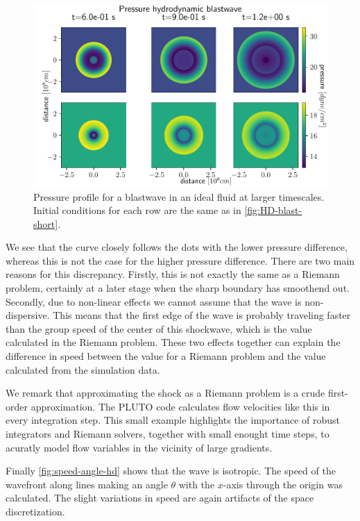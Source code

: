 \begin{figure}[H]
	\centering
	\includegraphics[width=\linewidth]{images/HD-blast-prs-2.pdf}
	\caption{Pressure profile for a blastwave in an ideal fluid at larger timescales. Initial conditions for each row are the same as in \autoref{fig:HD-blast-short}.}
	\label{fig:HD-blast-long}
\end{figure}

We see that the curve closely follows the dots with the lower pressure difference, whereas this is not the case for the higher pressure difference.
There are two main reasons for this discrepancy. 
Firstly, this is not exactly the same as a Riemann problem, certainly at a later stage when the sharp boundary has smoothend out.
Secondly, due to non-linear effects we cannot assume that the wave is non-dispersive. 
This means that the first edge of the wave is probably traveling faster than the group speed of the center of this shockwave, which is the value calculated in the Riemann problem.
These two effects together can explain the difference in speed between the value for a Riemann problem and the value calculated from the simulation data.

We remark that approximating the shock as a Riemann problem is a crude first-order approximation. 
The PLUTO code calculates flow velocities like this in every integration step. 
This small example highlights the importance of robust integrators and Riemann solvers, together with small enought time steps, to acuratly model flow variables in the vicinity of large gradients.

Finally \autoref{fig:speed-angle-hd} shows that the wave is isotropic. 
The speed of the wavefront along lines making an angle $\theta$ with the $x$-axis through the origin was calculated.
The slight variations in speed are again artifacts of the space discretization.

